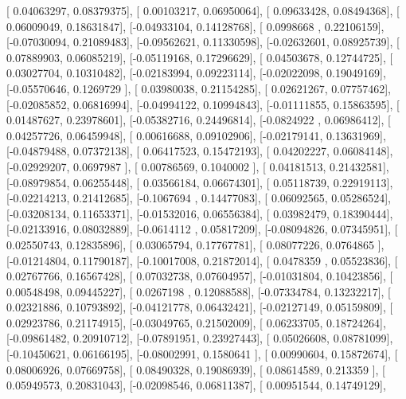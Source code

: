 \documentclass{article}
\begin{document}
       [ 0.04063297,  0.08379375],
       [ 0.00103217,  0.06950064],
       [ 0.09633428,  0.08494368],
       [ 0.06009049,  0.18631847],
       [-0.04933104,  0.14128768],
       [ 0.0998668 ,  0.22106159],
       [-0.07030094,  0.21089483],
       [-0.09562621,  0.11330598],
       [-0.02632601,  0.08925739],
       [ 0.07889903,  0.06085219],
       [-0.05119168,  0.17296629],
       [ 0.04503678,  0.12744725],
       [ 0.03027704,  0.10310482],
       [-0.02183994,  0.09223114],
       [-0.02022098,  0.19049169],
       [-0.05570646,  0.1269729 ],
       [ 0.03980038,  0.21154285],
       [ 0.02621267,  0.07757462],
       [-0.02085852,  0.06816994],
       [-0.04994122,  0.10994843],
       [-0.01111855,  0.15863595],
       [ 0.01487627,  0.23978601],
       [-0.05382716,  0.24496814],
       [-0.0824922 ,  0.06986412],
       [ 0.04257726,  0.06459948],
       [ 0.00616688,  0.09102906],
       [-0.02179141,  0.13631969],
       [-0.04879488,  0.07372138],
       [ 0.06417523,  0.15472193],
       [ 0.04202227,  0.06084148],
       [-0.02929207,  0.0697987 ],
       [ 0.00786569,  0.1040002 ],
       [ 0.04181513,  0.21432581],
       [-0.08979854,  0.06255448],
       [ 0.03566184,  0.06674301],
       [ 0.05118739,  0.22919113],
       [-0.02214213,  0.21412685],
       [-0.1067694 ,  0.14477083],
       [ 0.06092565,  0.05286524],
       [-0.03208134,  0.11653371],
       [-0.01532016,  0.06556384],
       [ 0.03982479,  0.18390444],
       [-0.02133916,  0.08032889],
       [-0.0614112 ,  0.05817209],
       [-0.08094826,  0.07345951],
       [ 0.02550743,  0.12835896],
       [ 0.03065794,  0.17767781],
       [ 0.08077226,  0.0764865 ],
       [-0.01214804,  0.11790187],
       [-0.10017008,  0.21872014],
       [ 0.0478359 ,  0.05523836],
       [ 0.02767766,  0.16567428],
       [ 0.07032738,  0.07604957],
       [-0.01031804,  0.10423856],
       [ 0.00548498,  0.09445227],
       [ 0.0267198 ,  0.12088588],
       [-0.07334784,  0.13232217],
       [ 0.02321886,  0.10793892],
       [-0.04121778,  0.06432421],
       [-0.02127149,  0.05159809],
       [ 0.02923786,  0.21174915],
       [-0.03049765,  0.21502009],
       [ 0.06233705,  0.18724264],
       [-0.09861482,  0.20910712],
       [-0.07891951,  0.23927443],
       [ 0.05026608,  0.08781099],
       [-0.10450621,  0.06166195],
       [-0.08002991,  0.1580641 ],
       [ 0.00990604,  0.15872674],
       [ 0.08006926,  0.07669758],
       [ 0.08490328,  0.19086939],
       [ 0.08614589,  0.213359  ],
       [ 0.05949573,  0.20831043],
       [-0.02098546,  0.06811387],
       [ 0.00951544,  0.14749129],
\end{document}
